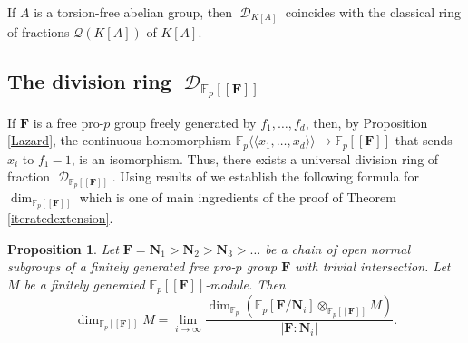 \documentclass[11pt]{amsart}
\newtheorem{pro}[lem]{Proposition}
\numberwithin{claimcounter}{lem}
\DeclareMathOperator{\D}{\mathcal D}
\newcommand{\F}{\mathbb{F}}
\begin{document}
 If $A$ is a torsion-free abelian group, then $\D_{K[A]}$ coincides with the classical ring of fractions $\mathcal Q(K[A])$ of $K[A]$.

 
 
  \subsection{The   division ring $\D_{\F_p[[\mathbf F]]}$}
If  $\mathbf F$ is a  free pro-$p$ group freely generated by $f_1,\ldots, f_d$,  then, by Proposition \ref{Lazard}, the continuous homomorphism $\F_p\langle \! \langle  x_1,\ldots,x_d\rangle \! \rangle  \to \F_p[[\mathbf F]]$ that sends $x_i$ to $f_1-1$, is an isomorphism. Thus, there exists a universal division 
ring of fraction   $\D_{\F_p[[\mathbf F]]}$. Using results of  \cite{Jataylor19} we establish the following formula for $\dim_{\F_p[[\mathbf F]]}$ which is one of main ingredients of  the proof of  Theorem \ref{iteratedextension}. 
\begin{pro}\label{limitprop} 
 Let $\mathbf F=\mathbf N_1>\mathbf N_2>\mathbf N_3> \ldots$ be a chain of open normal subgroups of a finitely generated free pro-$p$ group $\mathbf F$ with trivial intersection.
 Let $M$ be a finitely generated    $\F_p[[\mathbf F]]$-module. Then
$$\dim_{\F_p[[\mathbf F]]} M= \lim_{i\to \infty}\frac{\dim_{\F_p}(\F_p[ \mathbf F/\mathbf N_i]\otimes_{\F_p[[\mathbf F]]}M )}{|\mathbf F:\mathbf N_i|}.$$
\end{pro}
\end{document}

